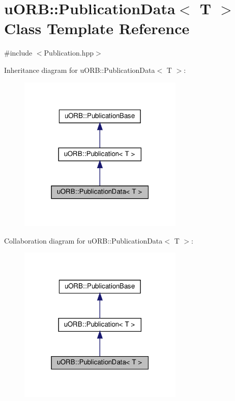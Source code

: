 \hypertarget{classuORB_1_1PublicationData}{}\section{u\+O\+RB\+:\+:Publication\+Data$<$ T $>$ Class Template Reference}
\label{classuORB_1_1PublicationData}


{\ttfamily \#include $<$Publication.\+hpp$>$}



Inheritance diagram for u\+O\+RB\+:\+:Publication\+Data$<$ T $>$\+:\nopagebreak
\begin{figure}[H]
\begin{center}
\leavevmode
\includegraphics[width=223pt]{dd/db7/classuORB_1_1PublicationData__inherit__graph}
\end{center}
\end{figure}


Collaboration diagram for u\+O\+RB\+:\+:Publication\+Data$<$ T $>$\+:\nopagebreak
\begin{figure}[H]
\begin{center}
\leavevmode
\includegraphics[width=223pt]{d1/dca/classuORB_1_1PublicationData__coll__graph}
\end{center}
\end{figure}
